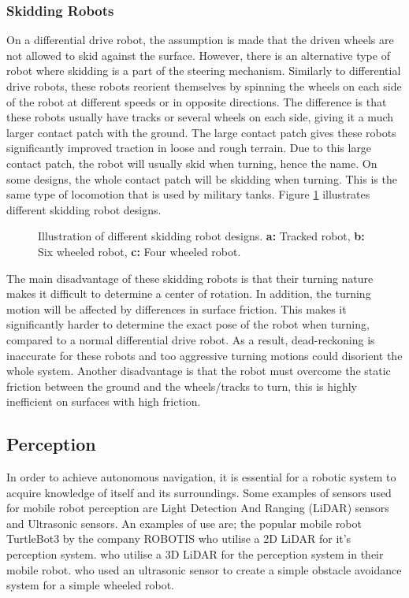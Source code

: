 \subsubsection{Skidding Robots} \label{sec:T:AN:MRD:SkiddingRobots}
On a differential drive robot, the assumption is made that the driven wheels are not allowed to skid against the surface. However, there is an alternative type of robot where skidding is a part of the steering mechanism. Similarly to differential drive robots, these robots reorient themselves by spinning the wheels on each side of the robot at different speeds or in opposite directions. The difference is that these robots usually have tracks or several wheels on each side, giving it a much larger contact patch with the ground. The large contact patch gives these robots significantly improved traction in loose and rough terrain. Due to this large contact patch, the robot will usually skid when turning, hence the name. On some designs, the whole contact patch will be skidding when turning. This is the same type of locomotion that is used by military tanks\cite{SiegwartRoland2011Itam}. Figure \ref{fig:skidDrive} illustrates different skidding robot designs.

\begin{figure}[htp]
  \centering
  
  \caption{Illustration of different skidding robot designs. \textbf{a:} Tracked robot, \textbf{b:} Six wheeled robot, \textbf{c:} Four wheeled robot.}
  \label{fig:skidDrive}
\end{figure}
The main disadvantage of these skidding robots is that their turning nature makes it difficult to determine a center of rotation. In addition, the turning motion will be affected by differences in surface friction. This makes it significantly harder to determine the exact pose of the robot when turning, compared to a normal differential drive robot. As a result, dead-reckoning is inaccurate for these robots and too aggressive turning motions could disorient the whole system. Another disadvantage is that the robot must overcome the static friction between the ground and the wheels/tracks to turn, this is highly inefficient on surfaces with high friction.


\subsection{Perception}\label{sec:T:AN:Perception}
In order to achieve autonomous navigation, it is essential for a robotic system to acquire knowledge of itself and its surroundings. Some examples of sensors used for mobile robot perception are Light Detection And Ranging (LiDAR) sensors and Ultrasonic sensors. An examples of use are; the popular mobile robot TurtleBot3 by the company ROBOTIS who utilise a 2D LiDAR for it's perception system\cite{turtlebot3RobotisManual}. \cite{Minghao2019LidarMob} who utilise a 3D LiDAR for the perception system in their mobile robot. \cite{Abueejela2018} who used an ultrasonic sensor to create a simple obstacle avoidance system for a simple wheeled robot.

